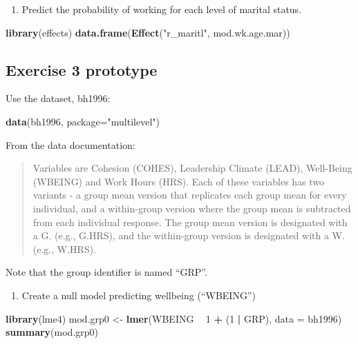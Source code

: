 \documentclass[]{book}
\newenvironment{Shaded}{\begin{snugshade}}{\end{snugshade}}
\newcommand{\KeywordTok}[1]{\textcolor[rgb]{0.13,0.29,0.53}{\textbf{#1}}}
\newcommand{\DataTypeTok}[1]{\textcolor[rgb]{0.13,0.29,0.53}{#1}}
\newcommand{\DecValTok}[1]{\textcolor[rgb]{0.00,0.00,0.81}{#1}}
\newcommand{\StringTok}[1]{\textcolor[rgb]{0.31,0.60,0.02}{#1}}
\newcommand{\OperatorTok}[1]{\textcolor[rgb]{0.81,0.36,0.00}{\textbf{#1}}}
\newcommand{\NormalTok}[1]{#1}
\providecommand{\tightlist}{%
  \setlength{\itemsep}{0pt}\setlength{\parskip}{0pt}}
\begin{document}
\begin{enumerate}
\def\labelenumi{\arabic{enumi}.}
\tightlist
\item
  Predict the probability of working for each level of marital status.
\end{enumerate}

\begin{Shaded}
\begin{Highlighting}[]
  \KeywordTok{library}\NormalTok{(effects)}
  \KeywordTok{data.frame}\NormalTok{(}\KeywordTok{Effect}\NormalTok{(}\StringTok{"r_maritl"}\NormalTok{, mod.wk.age.mar))}
\end{Highlighting}
\end{Shaded}

\subsection{Exercise 3 prototype}\label{exercise-3-prototype}

Use the dataset, bh1996:

\begin{Shaded}
\begin{Highlighting}[]
  \KeywordTok{data}\NormalTok{(bh1996, }\DataTypeTok{package=}\StringTok{"multilevel"}\NormalTok{)}
\end{Highlighting}
\end{Shaded}

From the data documentation:

\begin{quote}
Variables are Cohesion (COHES), Leadership Climate (LEAD), Well-Being
(WBEING) and Work Hours (HRS). Each of these variables has two variants
- a group mean version that replicates each group mean for every
individual, and a within-group version where the group mean is
subtracted from each individual response. The group mean version is
designated with a G. (e.g., G.HRS), and the within-group version is
designated with a W. (e.g., W.HRS).
\end{quote}

Note that the group identifier is named ``GRP''.

\begin{enumerate}
\def\labelenumi{\arabic{enumi}.}
\tightlist
\item
  Create a null model predicting wellbeing (``WBEING'')
\end{enumerate}

\begin{Shaded}
\begin{Highlighting}[]
  \KeywordTok{library}\NormalTok{(lme4)}
\NormalTok{  mod.grp0 <-}\StringTok{ }\KeywordTok{lmer}\NormalTok{(WBEING }\OperatorTok{~}\StringTok{ }\DecValTok{1} \OperatorTok{+}\StringTok{ }\NormalTok{(}\DecValTok{1} \OperatorTok{|}\StringTok{ }\NormalTok{GRP), }\DataTypeTok{data =}\NormalTok{ bh1996)}
  \KeywordTok{summary}\NormalTok{(mod.grp0)}
\end{Highlighting}
\end{Shaded}
\end{document}

